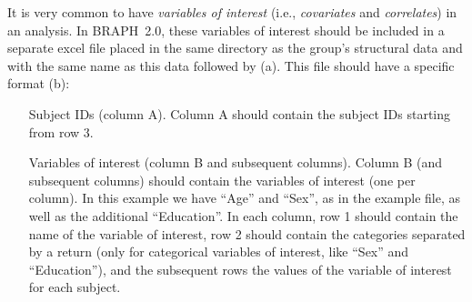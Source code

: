 \documentclass[justified]{tufte-handout}
\begin{document}
It is very common to have \emph{variables of interest} (i.e., \emph{covariates} and \emph{correlates}) in an analysis. In BRAPH~2.0, these variables of interest should be included in a separate excel file placed in the same directory as the group's structural data and with the same name as this data followed by  (a). This file should have a specific format (b):
\begin{itemize}

\item[Subject IDs (column A).]
Column A should contain the subject IDs starting from row 3.

\item[Variables of interest (column B and subsequent columns).]
Column B (and subsequent columns) should contain the variables of interest (one per column). 
In this example we have ``Age'' and ``Sex'', as in the example file, as well as the additional ``Education''.
In each column, row 1 should contain the name of the variable of interest, row 2 should contain the categories separated by a return (only for categorical variables of interest, like ``Sex'' and ``Education''), and the subsequent rows the values of the variable of interest for each subject.

\end{itemize}	
\end{document}
